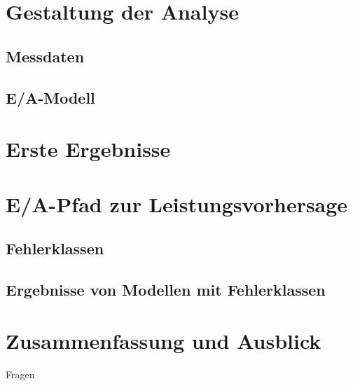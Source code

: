 \documentclass{beamer}
\begin{document}
\section{Gestaltung der Analyse}
\subsection{Messdaten}
\subsection{E/A-Modell}
\section{Erste Ergebnisse}
\section{E/A-Pfad zur Leistungsvorhersage}
\subsection{Fehlerklassen}
\subsection{Ergebnisse von Modellen mit Fehlerklassen}

\section{Zusammenfassung und Ausblick}

\begin{frame}
\Huge{\centerline{Fragen}}
\end{frame}

\end{document}
